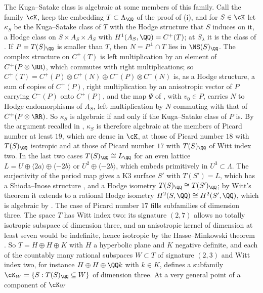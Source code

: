 \begin{remark}
The Kuga--Satake class is algebraic at some members of this family. Call the
family $\cK$, keep the embedding $T\subset\Lambda_{\QQ}$ of the proof of
(i), and
for $S\in\cK$ let $\kappa_{S}$ be the Kuga--Satake class of $T$ with the Hodge
structure that $S$ induces on it, a Hodge class on $S\times A_{S}\times A_{S}$
with $H^{1}(A_{S},\QQ)=C^{+}(T)$; at $S_{\lambda}$ it is the class of
. If $P=T(S)_{\QQ}$ is smaller than $T$, then
$N=P^{\perp}\cap T$ lies in $\NS(S)_{\QQ}$. The complex structure on
$C^{+}(T)$ is left multiplication by an element of $C^{+}(P\otimes\RR)$, which
commutes with right multiplications; so
$C^{+}(T)=C^{+}(P)\otimes C^{+}(N)\oplus C^{-}(P)\otimes C^{-}(N)$ is, as a
Hodge structure, a sum of copies of $C^{+}(P)$, right multiplication by an
anisotropic vector of $P$ carrying $C^{-}(P)$ onto $C^{+}(P)$, and the map
$\Psi$ of \cite[Proposition~11.7]{paperI}, with $v_{0}\in P$, carries $N$ to Hodge
endomorphisms of $A_{S}$, left multiplication by $N$ commuting with that of
$C^{+}(P\otimes\RR)$. So $\kappa_{S}$ is algebraic if and only if the
Kuga--Satake class of $P$ is. By the argument recalled in
, $\kappa_{S}$ is therefore algebraic at the members of
Picard number at least $19$, which are dense in $\cK$, at those of Picard
number $18$ with $T(S)_{\QQ}$ isotropic and at those of Picard number $17$
with $T(S)_{\QQ}$ of Witt index two. In the last two cases
$T(S)_{\QQ}\cong L_{\QQ}$ for an even lattice
$L=U\oplus\langle2a\rangle\oplus\langle-2b\rangle$ or
$U^{2}\oplus\langle-2b\rangle$, which embeds primitively in
$U^{3}\subset\Lambda$. The surjectivity of the period map gives a K3 surface
$S'$ with $T(S')=L$, which has a Shioda--Inose structure
\cite[Corollary~6.4]{Mor84}, and a Hodge isometry
$T(S)_{\QQ}\cong T(S')_{\QQ}$; by Witt's theorem it extends to a rational
Hodge isometry $H^{2}(S,\QQ)\cong H^{2}(S',\QQ)$, which is algebraic by
\cite{Bus19}. The case of Picard number $17$
fills subfamilies of dimension three. The space $T$ has Witt index two: its
signature $(2,7)$ allows no totally isotropic subspace of dimension three, and
an anisotropic kernel of dimension at least seven would be indefinite, hence
isotropic by the Hasse--Minkowski theorem \cite{OMe00}. So $T=H\oplus H\oplus
K$ with $H$ a hyperbolic plane and $K$ negative definite, and each of the
countably many rational subspaces $W\subset T$ of signature $(2,3)$ and Witt
index two, for instance $H\oplus H\oplus\QQ k$ with $k\in K$, defines a
subfamily $\cK_{W}=\{S:T(S)_{\QQ}\subseteq W\}$ of dimension three. At a very general point of a component of $\cK_{W}$

\end{remark}
